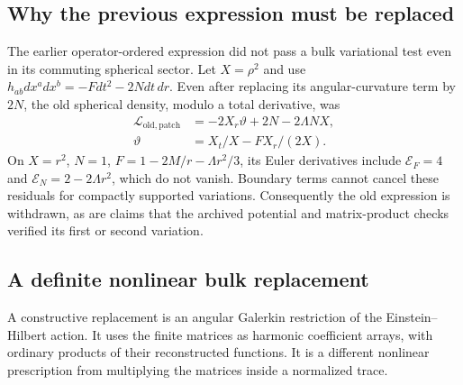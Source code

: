 \subsection{Why the previous expression must be replaced}

The earlier operator-ordered expression did not pass a bulk variational test even in its commuting spherical sector. Let $X=\rho^2$ and use $h_{ab}dx^a dx^b=-Fdt^2-2Ndt\,dr$. Even after replacing its angular-curvature term by $2N$, the old spherical density, modulo a total derivative, was
\begin{align}
\mathcal L_{\mathrm{old,patch}}&=-2X_r\vartheta+2N-2\Lambda NX,\nonumber\\
\vartheta&=X_t/X-FX_r/(2X).
\end{align}
On $X=r^2$, $N=1$, $F=1-2M/r-\Lambda r^2/3$, its Euler derivatives include $\mathcal E_F=4$ and $\mathcal E_N=2-2\Lambda r^2$, which do not vanish. Boundary terms cannot cancel these residuals for compactly supported variations. Consequently the old expression is withdrawn, as are claims that the archived potential and matrix-product checks verified its first or second variation.

\subsection{A definite nonlinear bulk replacement}

A constructive replacement is an angular Galerkin restriction of the Einstein--Hilbert action. It uses the finite matrices as harmonic coefficient arrays, with ordinary products of their reconstructed functions. It is a different nonlinear prescription from multiplying the matrices inside a normalized trace.


